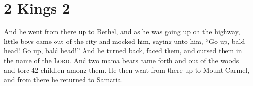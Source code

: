 \section{2 Kings 2}\label{2 Kings 2}
\begin{enumerate}
     And he went from there up to Bethel, and as he was going up on the highway, little boys came out of the city and mocked him, saying unto him, ``Go up, bald head! Go up, bald head!''%
     And he turned back, faced them, and cursed them in the name of the \textsc{Lord}. And two mama bears came forth and out of the woods and tore 42 children among them.%
     He then went from there up to Mount Carmel, and from there he returned to Samaria.%
\end{enumerate}
